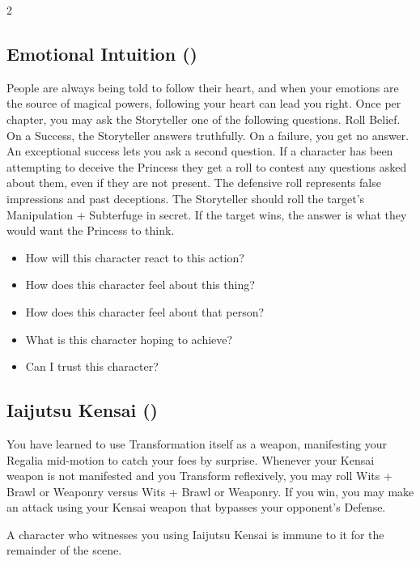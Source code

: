 \begin{multicols}{2}
\begin{mybox}
\end{mybox}

\subsection*{Emotional Intuition (\textbullet\textbullet\textbullet)}

People are always being told to follow their heart, and when your emotions are the source of magical powers, following your heart can lead you right. Once per chapter, you may ask the Storyteller one of the following questions. Roll Belief. On a Success, the Storyteller answers truthfully. On a failure, you get no answer. An exceptional success lets you ask a second question. If a character has been attempting to deceive the Princess they get a roll to contest any questions asked about them, even if they are not present. The defensive roll represents false impressions and past deceptions. The Storyteller should roll the target's Manipulation + Subterfuge in secret. If the target wins, the answer is what they would want the Princess to think.

\begin{itemize}
 \item How will this character react to this action?
 \item How does this character feel about this thing?
 \item How does this character feel about that person?
 \item What is this character hoping to achieve? 
 \item Can I trust this character? 
\end{itemize}

\subsection*{Iaijutsu Kensai (\textbullet\textbullet)}

You have learned to use Transformation itself as a weapon, manifesting your Regalia mid-motion to catch your foes by surprise. Whenever your Kensai weapon is not manifested and you Transform reflexively, you may roll Wits + Brawl or Weaponry versus Wits + Brawl or Weaponry. If you win, you may make an attack using your Kensai weapon that bypasses your opponent's Defense. 

A character who witnesses you using Iaijutsu Kensai is immune to it for the remainder of the scene. 


\end{multicols}
